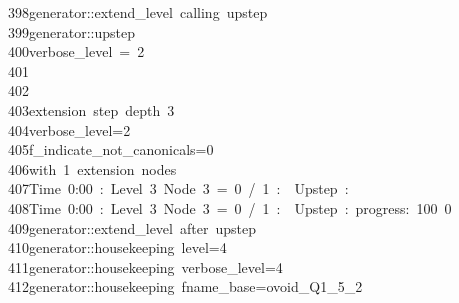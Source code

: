 \begin{tabbing}
398\>generator::extend\_level\ calling\ upstep\\[0pt]
399\>generator::upstep\\[0pt]
400\>verbose\_level\ =\ 2\\[0pt]
401\>\\[0pt]
402\>\\[0pt]
403\>extension\ step\ depth\ 3\\[0pt]
404\>verbose\_level=2\\[0pt]
405\>f\_indicate\_not\_canonicals=0\\[0pt]
406\>with\ 1\ extension\ nodes\\[0pt]
407\>Time\ 0:00\ :\ Level\ 3\ Node\ 3\ =\ 0\ /\ 1\ :\ \ Upstep\ :\ \\[0pt]
408\>Time\ 0:00\ :\ Level\ 3\ Node\ 3\ =\ 0\ /\ 1\ :\ \ Upstep\ :\ progress:\ 100\ 0\ \ \\[0pt]
409\>generator::extend\_level\ after\ upstep\\[0pt]
410\>generator::housekeeping\ level=4\\[0pt]
411\>generator::housekeeping\ verbose\_level=4\\[0pt]
412\>generator::housekeeping\ fname\_base=ovoid\_Q1\_5\_2\\[0pt]

\end{tabbing}

